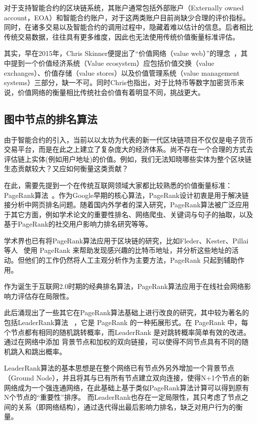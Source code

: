 对于支持智能合约的区块链系统，其账户通常包括外部账户（Externally owned account，EOA）和智能合约账户，对于这两类账户目前尚缺少合理的评价指标。同时，在诸多交易以及智能合约的调用过程中，隐藏着难以估计的信息。后者相比传统交易数据，往往具有更多维度，因此也无法使用传统价值衡量标准评估。

其实，早在2015年，Chris Skinner便提出了“价值网络（value web）”的理念~\cite{ChrisSkinner}，其中提到一个价值经济系统（Value ecosystem）应包括价值交换（value exchanges）、价值存储（value stores）以及价值管理系统（value management systems）三部分，缺一不可。同时Chris也指出，对于比特币等数字加密货币来说，价值网络的衡量相比传统社会价值有着明显不同，挑战更大。






\subsection{图中节点的排名算法}
由于智能合约的引入，当前以以太坊为代表的新一代区块链项目不仅仅是电子货币交易平台，而是在此之上建立了复杂庞大的经济体系。尚不存在一个合理的方式去评估链上实体(例如用户地址)的价值。例如，我们无法知晓哪些实体为整个区块链生态贡献较大？又应如何衡量这类贡献？

在此，需要先提到一个在传统互联网领域大家都比较熟悉的价值衡量标准：PageRank算法~\cite{page1999pagerank}。作为Google早期的核心算法，PageRank设计初衷是用于解决链接分析中网页排名问题。随着国内外学者的深入研究，PageRank算法被广泛应用于其它方面，例如学术论文的重要性排名、网络爬虫、关键词与句子的抽取，以及基于PageRank的社交用户影响力排名研究等等。

学术界也已有将PageRank算法应用于区块链的研究，比如Fleder、Kester、Pillai等人~\cite{Fleder2015} 使用 PageRank 来帮助发现感兴趣的比特币地址，并分析这些地址的活 动。但他们的工作仍然将人工主观分析作为主要方法，PageRank 只起到辅助作用。

作为诞生于互联网2.0时期的经典排名算法，PageRank算法应用于在线社会网络影响力评估存在局限性。

此后涌现出了一些其它在PageRank算法基础上进行改良的研究，其中较为著名的包括LeaderRank算法 ~\cite{Li2014}，它是 PageRank 的一种拓展形式。在 PageRank 中，每个节点都有相同的随机跳转概率，而LeaderRank 是对跳转概率简单有效的改进。通过在网络中添加 背景节点和加权的双向链接，可以使得不同节点具有不同的随机跳入和跳出概率。

LeaderRank算法的基本思想是在整个网络已有节点外另外增加一个背景节点（Ground Node），并且将其与已有所有节点建立双向连接，使得N+1个节点的新网络成为一个强连通网络，在此基础上基于类似PageRank算法计算可以得到原有N个节点的“重要性”排序。
而LeaderRank也存在一定局限性，其只考虑了节点之间的关系（即网络结构），通过迭代得出最后影响力排名，缺乏对用户行为的衡量。

